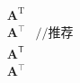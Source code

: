 \begin{align*}
& \mathbf{A}^\mathrm{T}                 \\
& \mathbf{A}^\top           &// 推荐     \\
& \mathbf{A}^\mathsf{T}                 \\
& \mathbf{A}^\intercal                  \\
\end{align*}